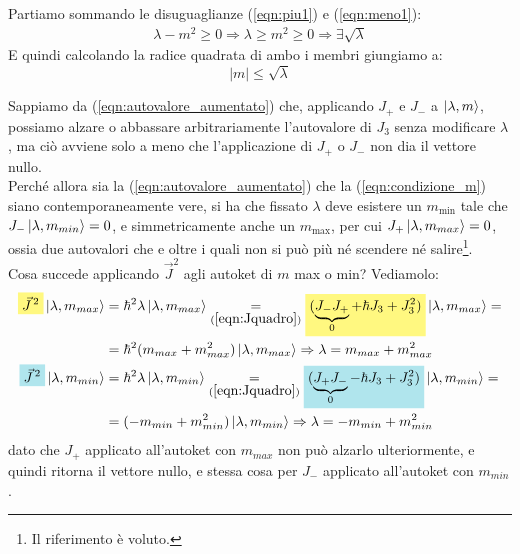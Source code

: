 \documentclass[../../FisicaTeorica.tex]{subfiles}
\begin{document}
Partiamo sommando le disuguaglianze (\ref{eqn:piu1}) e (\ref{eqn:meno1}): 
\begin{align*}
\lambda - m^2 \geq 0 \Rightarrow \lambda \geq m^2 \geq 0 \Rightarrow  \exists \sqrt{\lambda}
\end{align*}
E quindi calcolando la radice quadrata di ambo i membri giungiamo a:
\begin{equation}
|m| \leq \sqrt{\lambda}
\label{eqn:condizione_m}
\end{equation}

Sappiamo da (\ref{eqn:autovalore_aumentato}) che, applicando $J_+$ e $J_-$ a $\Ket{\lambda,m}$, possiamo alzare o abbassare arbitrariamente l'autovalore di $J_3$ senza modificare $\lambda$, ma ciò avviene solo a meno che l'applicazione di $J_+$ o $J_-$ non dia il vettore nullo.\\

Perché allora sia la (\ref{eqn:autovalore_aumentato}) che la (\ref{eqn:condizione_m}) siano contemporaneamente vere, si ha che fissato $\lambda$ deve esistere un $m_{\min}$ tale che $J_- \Ket{\lambda, m_{min}}=0$, e simmetricamente anche un $m_{\max}$, per cui $J_{+}\Ket{\lambda, m_{max}} = 0$, ossia due autovalori che  e oltre i quali non si può più né scendere né salire\footnote{Il riferimento è voluto.}.\\

Cosa succede applicando $\vec{J}^2$ agli autoket di $m$ max o min? Vediamolo:\begin{align*}
\hlc{Yellow}{\vec{J}^{\,2}} \ket{\lambda, m_{max}} &= \hbar^2 \lambda \ket{\lambda, m_{max}} \underset{(\ref{eqn:Jquadro})}{=} \hlc{Yellow}{(\underbrace{J_- J_+}_{0} + \hbar J_3 + J_3^2)} \ket{\lambda, m_{max}} =
\\&= \hbar^2(m_{max}+m_{max}^2)\ket{\lambda, m_{max}} \Rightarrow \lambda = m_{max} + m^2_{max}\\
\hlc{SkyBlue}{\vec{J}^{\,2}}\ket{\lambda, m_{min}} &= \hbar^2 \lambda \ket{\lambda, m_{min}} \underset{(\ref{eqn:Jquadro})}{=
}\hlc{SkyBlue}{(\underbrace{J_+ J_-}_{0} - \hbar J_3 + J_3^2)} \ket{\lambda, m_{min}} =\\&= (-m_{min}+m_{min}^2) \ket{\lambda, m_{min}} \Rightarrow \lambda = -m_{min} + m_{min}^2
\end{align*}
dato che $J_+$ applicato all'autoket con $m_{max}$ non può alzarlo ulteriormente, e quindi ritorna il vettore nullo, e stessa cosa per $J_-$ applicato all'autoket con $m_{min}$.
\end{document}
